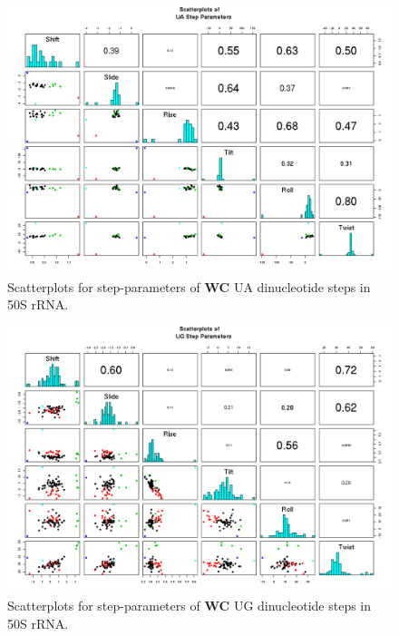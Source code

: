 \begin{figure}[H]
\centering
\includegraphics[angle=90, scale=0.6]{WC/UA.png}
\caption{Scatterplots for step-parameters of \textbf{WC} UA dinucleotide steps
in 50S rRNA.}
\label{fig:stepsUA}
\end{figure}

\begin{figure}[H]
\centering
\includegraphics[angle=90, scale=0.6]{WC/UG.png}
\caption{Scatterplots for step-parameters of \textbf{WC} UG dinucleotide steps
in 50S rRNA.}
\label{fig:stepsUG}
\end{figure}

